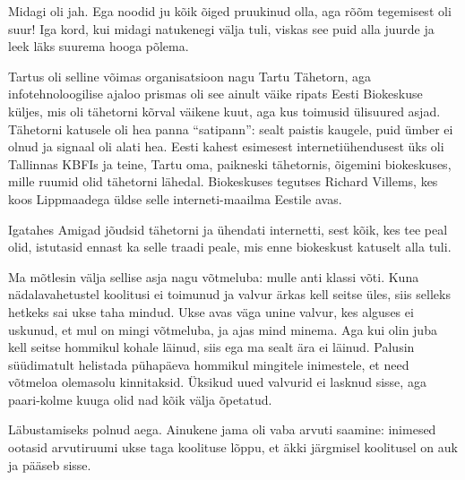 
Midagi oli jah. Ega noodid ju kõik õiged pruukinud olla, aga rõõm tegemisest oli suur! Iga kord, kui midagi 
natukenegi välja tuli, viskas see puid alla juurde ja leek läks suurema hooga põlema.

Tartus oli selline võimas 
organisatsioon nagu Tartu 
Tähetorn, aga infotehnoloogilise ajaloo prismas oli see ainult väike ripats Eesti 
Biokeskuse 
küljes, mis oli tähetorni kõrval väikene kuut, aga kus toimusid 
ülisuured asjad. Tähetorni katusele oli hea panna \enquote{satipann}: sealt paistis kaugele, puid ümber ei olnud ja
signaal oli alati hea. Eesti kahest
esimesest internetiühendusest üks oli Tallinnas KBFIs ja teine, Tartu oma, paikneski 
tähetornis, õigemini biokeskuses, mille ruumid olid tähetorni 
lähedal. Biokeskuses tegutses Richard Villems, kes koos Lippmaadega üldse selle interneti-maailma Eestile avas.

Igatahes Amigad jõudsid tähetorni ja ühendati internetti, sest kõik, kes tee peal olid, istutasid ennast ka selle traadi peale, mis enne biokeskust katuselt 
alla tuli. 


Ma mõtlesin välja sellise asja nagu võtmeluba: mulle anti klassi võti. Kuna nädalavahetustel koolitusi ei toimunud ja valvur ärkas kell seitse üles, 
siis selleks hetkeks sai ukse taha mindud. Ukse avas väga unine valvur, kes alguses ei uskunud, et mul on mingi võtmeluba, ja ajas mind minema. 
Aga kui olin juba kell seitse hommikul kohale läinud, siis ega ma sealt ära ei 
läinud. Palusin süüdimatult helistada pühapäeva hommikul mingitele inimestele, et need võtmeloa olemasolu kinnitaksid. Üksikud uued valvurid ei lasknud sisse, aga paari-kolme kuuga 
olid nad kõik välja õpetatud.


Läbustamiseks polnud aega. Ainukene jama oli vaba arvuti saamine: inimesed ootasid arvutiruumi ukse taga koolituse lõppu, et äkki järgmisel koolitusel on auk ja pääseb sisse. 

